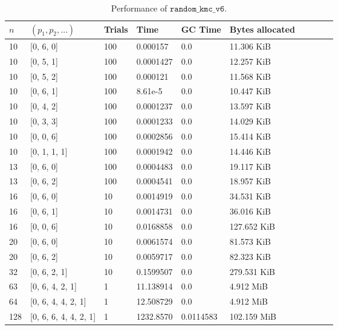 \begin{table*}[ht!]
  \centering
  \caption{Performance of $\texttt{random\_kmc\_v6}$.}
  \label{tab:perf_v6}
  \begin{threeparttable}
    \begin{tabular}{llllllllll}
      \toprule
      $n$ & $(p_1, p_2, \ldots)$ & Trials & Time  & GC Time & Bytes allocated \\
      \midrule
      10 & [0, 6, 0] & 100 & 0.000157 & 0.0 & 11.306 KiB \\
      10 & [0, 5, 1] & 100 & 0.0001427 & 0.0 & 12.257 KiB \\
      10 & [0, 5, 2] & 100 & 0.000121 & 0.0 & 11.568 KiB \\
      10 & [0, 6, 1] & 100 & 8.61e-5 & 0.0 & 10.447 KiB \\
      10 & [0, 4, 2] & 100 & 0.0001237 & 0.0 & 13.597 KiB \\
      10 & [0, 3, 3] & 100 & 0.0001233 & 0.0 & 14.029 KiB \\
      10 & [0, 0, 6] & 100 & 0.0002856 & 0.0 & 15.414 KiB \\
      10 & [0, 1, 1, 1] & 100 & 0.0001942 & 0.0 & 14.446 KiB \\
      13 & [0, 6, 0] & 100 & 0.0004483 & 0.0 & 19.117 KiB \\
      13 & [0, 6, 2] & 100 & 0.0004541 & 0.0 & 18.957 KiB \\
      16 & [0, 6, 0] & 10 & 0.0014919 & 0.0 & 34.531 KiB \\
      16 & [0, 6, 1] & 10 & 0.0014731 & 0.0 & 36.016 KiB \\
      16 & [0, 0, 6] & 10 & 0.0168858 & 0.0 & 127.652 KiB \\
      20 & [0, 6, 0] & 10 & 0.0061574 & 0.0 & 81.573 KiB \\
      20 & [0, 6, 2] & 10 & 0.0059717 & 0.0 & 82.323 KiB \\
      32 & [0, 6, 2, 1] & 10 & 0.1599507 & 0.0 & 279.531 KiB \\
      63 & [0, 6, 4, 2, 1] & 1 & 11.138914 & 0.0 & 4.912 MiB \\
      64 & [0, 6, 4, 4, 2, 1] & 1 & 12.508729 & 0.0 & 4.912 MiB \\
      128 & [0, 6, 6, 4, 4, 2, 1] & 1 & 1232.8570 & 0.0114583 & 102.159 MiB \\
      \bottomrule
    \end{tabular}
  \end{threeparttable}
\end{table*}
\skelpar

